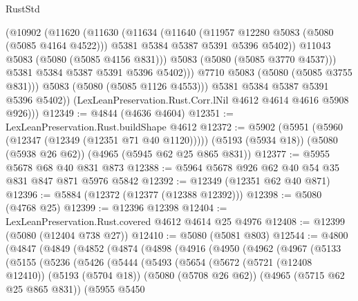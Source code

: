 \begin{lexlean}{RustStd}
\begin{coremodule}
                    (@10902
                      (@11620
                        (@11630
                          (@11634
                            (@11640
                              (@11957 @12280 @5083 (@5080 (@5085 @4164 @4522)))
                              @5381
                              @5384
                              @5387
                              @5391
                              @5396
                              @5402))
                          @11043
                          @5083
                          (@5080 (@5085 @4156 @831)))
                        @5083
                        (@5080 (@5085 @3770 @4537)))
                      @5381
                      @5384
                      @5387
                      @5391
                      @5396
                      @5402)))
                @7710
                @5083
                (@5080 (@5085 @3755 @831)))
              @5083
              (@5080 (@5085 @1126 @4553)))
            @5381
            @5384
            @5387
            @5391
            @5396
            @5402))
        (LexLeanPreservation.Rust.Corr.lNil @4612 @4614 @4616 @5908 @926)))
@12349 := @4844 (@4636 @4604)
@12351 := LexLeanPreservation.Rust.buildShape @4612
@12372 := @5902
    (@5951 (@5960 (@12347 (@12349 (@12351 @71 @40 @1120)))))
    (@5193 (@5934 @18))
    (@5080 (@5938 @26 @62))
    (@4965 (@5945 @62 @25 @865 @831))
@12377 := @5955 @5678 @68 @40 @831 @873
@12388 := @5964 @5678 @926 @62 @40 @54 @35 @831 @847 @871 @5976 @5842
@12392 := @12349 (@12351 @62 @40 @871)
@12396 := @5884 (@12372 (@12377 (@12388 @12392)))
@12398 := @5080 (@4768 @25)
@12399 := @12396 @12398
@12404 := LexLeanPreservation.Rust.covered @4612 @4614 @25 @4976
@12408 := @12399 (@5080 (@12404 @738 @27))
@12410 := @5080 (@5081 @803)
@12544 := @4800
    (@4847
      (@4849
        (@4852
          (@4874
            (@4898
              (@4916
                (@4950
                  (@4962
                    (@4967
                      (@5133
                        (@5155
                          (@5236
                            (@5426
                              (@5444
                                (@5493
                                  (@5654
                                    (@5672
                                      (@5721 (@12408 @12410))
                                      (@5193 (@5704 @18))
                                      (@5080 (@5708 @26 @62))
                                      (@4965 (@5715 @62 @25 @865 @831))
                                      (@5955
                                        @5450

\end{coremodule}
\end{lexlean}
